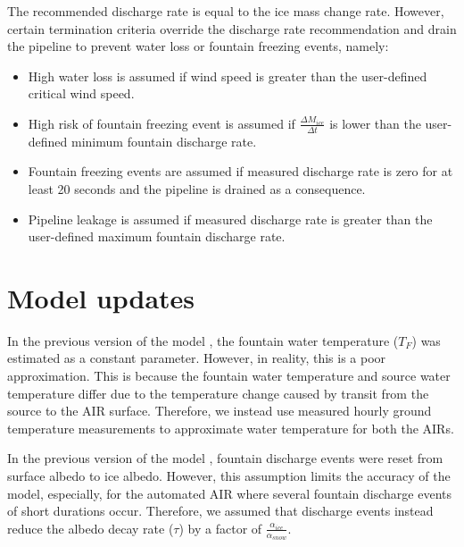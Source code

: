\documentclass[tc, manuscript]{copernicus}
\begin{document}
The recommended discharge rate is equal to the ice mass change rate. However, certain termination criteria
override the discharge rate recommendation and drain the pipeline to prevent water loss or fountain freezing
events, namely: 

\begin{itemize}

\item High water loss is assumed if wind speed is greater than the user-defined critical wind speed.

\item High risk of fountain freezing event is assumed if $\frac{\Delta M_{ice}}{\Delta t}$ is lower than the user-defined minimum fountain discharge rate. 

\item Fountain freezing events are assumed if measured discharge rate is zero for at least 20 seconds and the pipeline is drained as a
  consequence.

\item Pipeline leakage is assumed if measured discharge rate is greater than the user-defined maximum fountain discharge rate.

\end{itemize}

\section{Model updates} \label{sec:Mod_updates}

In the previous version of the model \citep{balasubramanianInfluenceMeteorologicalConditions2022}, the fountain
water temperature ($T_F$) was estimated as a constant parameter. However, in reality, this is a poor
approximation. This is because the fountain water temperature and source water temperature differ due to the
temperature change caused by transit from the source to the  AIR surface. Therefore, we instead use measured
hourly ground temperature measurements to approximate water temperature for both the AIRs.

In the previous version of the model \citep{balasubramanianInfluenceMeteorologicalConditions2022}, fountain
discharge events were reset from surface albedo to ice albedo. However, this assumption limits the accuracy of
the model, especially, for the automated AIR where several fountain discharge events of short durations occur.
Therefore, we assumed that discharge events instead reduce the albedo decay rate ($\tau$) by a 
factor of $\frac{\alpha_{ice}}{\alpha_{snow}}$.
\end{document}
